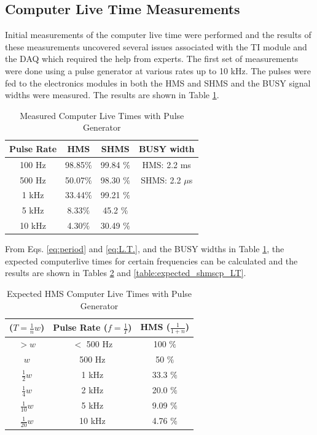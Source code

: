 \documentclass[letterpaper, 12 pt, conference]{ieeeconf}  %
\begin{document}
\subsection{Computer Live Time Measurements}
\noindent Initial measurements of the computer live time were performed and the results of these measurements uncovered several issues associated with the
TI module and the DAQ which required the help from experts. The first set of measurements were done using a pulse generator at various rates up to 10 kHz. The pulses were fed to the electronics modules in both the HMS and SHMS and the BUSY signal widths were measured. The results are shown in Table \ref{table:cp_LT}. \\ 
\begin{table}[ht]
\caption{Measured Computer Live Times with Pulse Generator}
\centering
{\def\arraystretch{1.6}\tabcolsep=5pt
\begin{tabular}{c c c c}
\hline\hline
Pulse Rate & HMS & SHMS & BUSY width \\ [0.5ex] %
\hline
100 Hz & 98.85$\%$ & 99.84 $\%$ &HMS: 2.2 ms \\
500 Hz & 50.07$\%$ & 98.30 $\%$  &SHMS: 2.2 $\mu$s \\
1 kHz  & 33.44$\%$ & 99.21 $\%$  \\
5 kHz  & 8.33$\%$ & 45.2 $\%$ \\
10 kHz & 4.30$\%$ & 30.49 $\%$ \\ [1ex]
\hline
\end{tabular}
}
\label{table:cp_LT}
\end{table} 
\indent From Eqs. \ref{eq:period} and \ref{eq:L.T.}, and the BUSY widths in Table \ref{table:cp_LT}, the expected computerlive times for certain frequencies can be calculated and the results are shown in
Tables \ref{table:expected_hmscp_LT} and \ref{table:expected_shmscp_LT}. \\
\begin{table}[ht]
\caption{Expected HMS Computer Live Times with Pulse Generator}
\centering
{\def\arraystretch{1.6}\tabcolsep=5pt
\begin{tabular}{c c c}
\hline\hline
($T=\frac{1}{n}w$) & Pulse Rate ($f = \frac{1}{T}$) & HMS ($\frac{1}{1+n}$) \\ [0.5ex] %
\hline
$>w$             & $<$ 500 Hz & 100 $\%$ \\
$w$              & 500 Hz & 50  $\%$ \\
$\frac{1}{2}w$   & 1 kHz & 33.3 $\%$  \\
$\frac{1}{4}w$   & 2 kHz & 20.0 $\%$  \\
$\frac{1}{10}w$  & 5 kHz & 9.09 $\%$ \\
$\frac{1}{20}w$  & 10 kHz & 4.76 $\%$ \\ [1ex]
\hline
\end{tabular}
}
\label{table:expected_hmscp_LT}
\end{table} 
\end{document}
